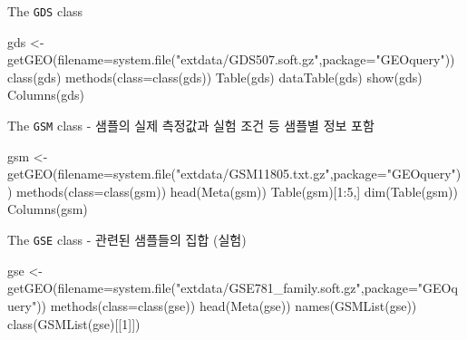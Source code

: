 \documentclass[
]{book}
\newenvironment{Shaded}{\begin{snugshade}}{\end{snugshade}}
\newcommand{\AttributeTok}[1]{\textcolor[rgb]{0.77,0.63,0.00}{#1}}
\newcommand{\DecValTok}[1]{\textcolor[rgb]{0.00,0.00,0.81}{#1}}
\newcommand{\FunctionTok}[1]{\textcolor[rgb]{0.00,0.00,0.00}{#1}}
\newcommand{\NormalTok}[1]{#1}
\newcommand{\OtherTok}[1]{\textcolor[rgb]{0.56,0.35,0.01}{#1}}
\newcommand{\SpecialCharTok}[1]{\textcolor[rgb]{0.00,0.00,0.00}{#1}}
\newcommand{\StringTok}[1]{\textcolor[rgb]{0.31,0.60,0.02}{#1}}
\begin{document}
The \texttt{GDS} class

\begin{Shaded}
\begin{Highlighting}[]
\NormalTok{gds }\OtherTok{\textless{}{-}} \FunctionTok{getGEO}\NormalTok{(}\AttributeTok{filename=}\FunctionTok{system.file}\NormalTok{(}\StringTok{"extdata/GDS507.soft.gz"}\NormalTok{,}\AttributeTok{package=}\StringTok{"GEOquery"}\NormalTok{))}
\FunctionTok{class}\NormalTok{(gds)}
\FunctionTok{methods}\NormalTok{(}\AttributeTok{class=}\FunctionTok{class}\NormalTok{(gds))}
\FunctionTok{Table}\NormalTok{(gds)}
\FunctionTok{dataTable}\NormalTok{(gds)}
\FunctionTok{show}\NormalTok{(gds)}
\FunctionTok{Columns}\NormalTok{(gds)}
\end{Highlighting}
\end{Shaded}

The \texttt{GSM} class - 샘플의 실제 측정값과 실험 조건 등 샘플별 정보 포함

\begin{Shaded}
\begin{Highlighting}[]
\NormalTok{gsm }\OtherTok{\textless{}{-}} \FunctionTok{getGEO}\NormalTok{(}\AttributeTok{filename=}\FunctionTok{system.file}\NormalTok{(}\StringTok{"extdata/GSM11805.txt.gz"}\NormalTok{,}\AttributeTok{package=}\StringTok{"GEOquery"}\NormalTok{))}
\FunctionTok{methods}\NormalTok{(}\AttributeTok{class=}\FunctionTok{class}\NormalTok{(gsm))}
\FunctionTok{head}\NormalTok{(}\FunctionTok{Meta}\NormalTok{(gsm))}
\FunctionTok{Table}\NormalTok{(gsm)[}\DecValTok{1}\SpecialCharTok{:}\DecValTok{5}\NormalTok{,]}
\FunctionTok{dim}\NormalTok{(}\FunctionTok{Table}\NormalTok{(gsm))}
\FunctionTok{Columns}\NormalTok{(gsm)}
\end{Highlighting}
\end{Shaded}

The \texttt{GSE} class - 관련된 샘플들의 집합 (실험)

\begin{Shaded}
\begin{Highlighting}[]
\NormalTok{gse }\OtherTok{\textless{}{-}} \FunctionTok{getGEO}\NormalTok{(}\AttributeTok{filename=}\FunctionTok{system.file}\NormalTok{(}\StringTok{"extdata/GSE781\_family.soft.gz"}\NormalTok{,}\AttributeTok{package=}\StringTok{"GEOquery"}\NormalTok{))}
\FunctionTok{methods}\NormalTok{(}\AttributeTok{class=}\FunctionTok{class}\NormalTok{(gse))}
\FunctionTok{head}\NormalTok{(}\FunctionTok{Meta}\NormalTok{(gse))}
\FunctionTok{names}\NormalTok{(}\FunctionTok{GSMList}\NormalTok{(gse))}
\FunctionTok{class}\NormalTok{(}\FunctionTok{GSMList}\NormalTok{(gse)[[}\DecValTok{1}\NormalTok{]])}
\end{Highlighting}
\end{Shaded}
\end{document}

